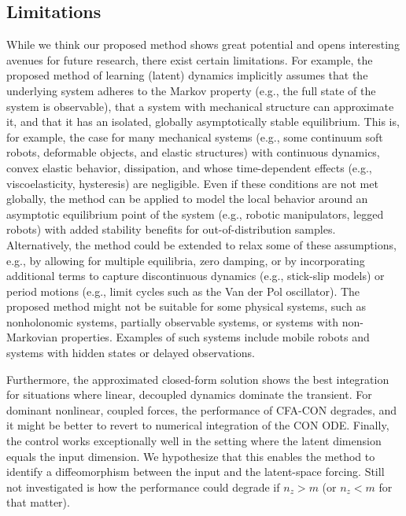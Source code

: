 \subsection{Limitations}
While we think our proposed method shows great potential and opens interesting avenues for future research, there exist certain limitations. For example, the proposed method of learning (latent) dynamics implicitly assumes that the underlying system adheres to the Markov property (e.g., the full state of the system is observable), that a system with mechanical structure can approximate it, and that it has an isolated, globally asymptotically stable equilibrium. This is, for example, the case for many mechanical systems (e.g., some continuum soft robots, deformable objects, and elastic structures) with continuous dynamics, convex elastic behavior, dissipation, and whose time-dependent effects (e.g., viscoelasticity, hysteresis) are negligible. Even if these conditions are not met globally, the method can be applied to model the local behavior around an asymptotic equilibrium point of the system (e.g., robotic manipulators, legged robots) with added stability benefits for out-of-distribution samples. Alternatively, the method could be extended to relax some of these assumptions, e.g., by allowing for multiple equilibria, zero damping, or by incorporating additional terms to capture discontinuous dynamics (e.g., stick-slip models) or period motions (e.g., limit cycles such as the Van der Pol oscillator). The proposed method might not be suitable for some physical systems, such as nonholonomic systems, partially observable systems, or systems with non-Markovian properties. Examples of such systems include mobile robots and systems with hidden states or delayed observations. %

Furthermore, the approximated closed-form solution shows the best integration for situations where linear, decoupled dynamics dominate the transient. For dominant nonlinear, coupled forces, the performance of \gls{CFA-CON} degrades, and it might be better to revert to numerical integration of the \gls{CON} ODE.
Finally, the control works exceptionally well in the setting where the latent dimension equals the input dimension. We hypothesize that this enables the method to identify a diffeomorphism between the input and the latent-space forcing. 
Still not investigated is how the performance could degrade if $n_z > m$ (or $n_z < m$ for that matter).
